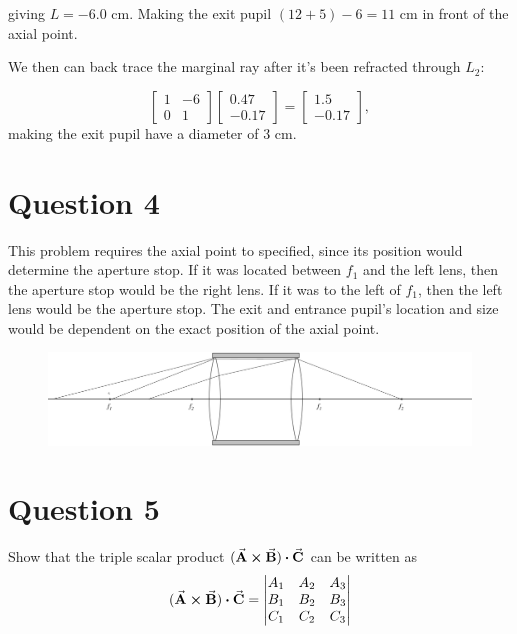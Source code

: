 \documentclass[a4paper]{article}
\begin{document}
giving $L=-6.0$ cm. Making the exit pupil $(12 + 5) - 6 = 11$ cm in front of the axial point.

We then can back trace the marginal ray after it's been refracted through $L_2$:

$$
\begin{bmatrix}
    1 & -6\\
    0 & 1
\end{bmatrix}
\begin{bmatrix}
    0.47\\
    -0.17 
\end{bmatrix}
=
\begin{bmatrix}
    1.5\\
    -0.17
\end{bmatrix},
$$
making the exit pupil have a diameter of $3$ cm.

\newpage

\section*{Question 4}
This problem requires the axial point to specified, since its position would determine the aperture stop. If it was located between $f_1$ and the left lens, then the aperture stop would be the right lens. If it was to the left of $f_1$, then the left lens would be the aperture stop. The exit and entrance pupil's location and size would be dependent on the exact position of the axial point.

\begin{figure}[htb!]
    \centering
    \includegraphics[angle=90, scale=0.4]{hw2q4.pdf} %
\end{figure}


\section*{Question 5}
Show that the triple scalar product $(\va{A} \cross \va{B}) \vdot \va{C}$ can be written as
$$ (\va{A} \cross \va{B}) \vdot \va{C} = 
    \begin{vmatrix}
    A_1 & A_2 & A_3 \\
    B_1 & B_2 & B_3 \\
    C_1 & C_2 & C_3 
    \end{vmatrix}  $$ \\\\
\end{document}
